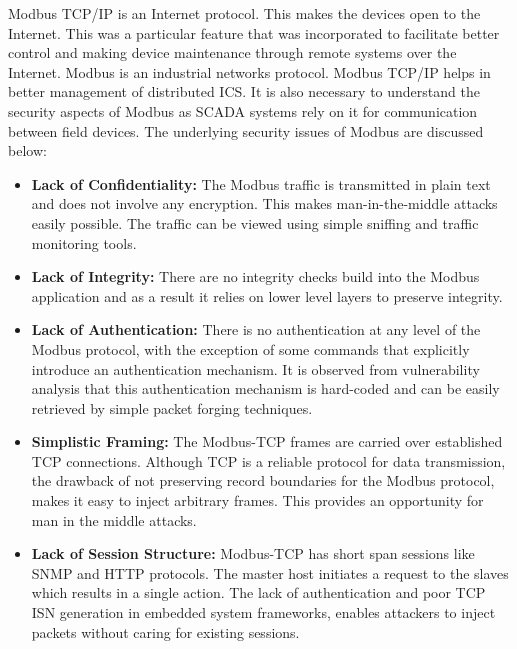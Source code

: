 \documentclass[article,msc=informatik,type=msc,colorback,accentcolor=tud9c]{tudthesis}
\begin{document}
    	Modbus TCP/IP is an Internet protocol. This makes the devices open to the Internet. This was a particular feature that was incorporated to facilitate better control and making device maintenance through remote systems over the Internet. Modbus is an industrial networks protocol. Modbus TCP/IP helps in better management of distributed \ac{ICS}. It is also necessary to understand the security aspects of Modbus as \ac{SCADA} systems rely on it for communication between field devices. The underlying security issues of Modbus are discussed below:
    	
    	\vspace{5mm}
    	
    	\begin{itemize}
    	
    	\item\textbf{Lack of Confidentiality:} The Modbus traffic is transmitted in plain text and does not involve any encryption. This makes man-in-the-middle attacks easily possible. The traffic can be viewed using simple sniffing and traffic monitoring tools. 
    	
    	\item\textbf{Lack of Integrity:} There are no integrity checks build into the Modbus application and as a result it relies on lower level layers to preserve integrity. 
    	
    	
    	\item\textbf{Lack of Authentication:} There is no authentication at any level of the Modbus protocol, with the exception of some commands that explicitly introduce an authentication mechanism. It is observed from vulnerability analysis that this authentication mechanism is hard-coded and can be easily retrieved by simple packet forging techniques. 
    	
    	
    	\item\textbf{Simplistic Framing:} The Modbus-TCP frames are carried over established TCP connections. Although TCP is a reliable protocol for data  transmission, the drawback of not preserving record boundaries for the Modbus protocol, makes it easy to inject arbitrary frames. This provides an opportunity for man in the middle attacks. 
    	
    	
    	\item\textbf{Lack of Session Structure:} Modbus-TCP has short span sessions like SNMP and HTTP protocols. The master host initiates a request to the slaves which results in a single action. The lack of authentication and poor TCP \ac{ISN} generation in embedded system frameworks, enables attackers to inject packets without caring for existing sessions.  
    	 	
    	\end{itemize}
    
\end{document}
